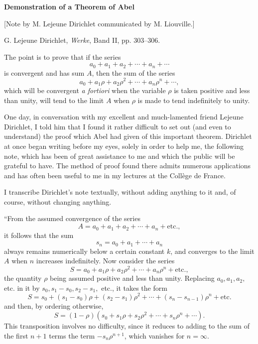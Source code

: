 \documentclass[11pt]{article}
\begin{document}
\begin{center}
{\Large\bfseries Demonstration of a Theorem of Abel\par}
\vspace{0.35em}
{\normalsize [Note by M. Lejeune Dirichlet communicated by M. Liouville.]\par}
\vspace{0.8em}
{\small G. Lejeune Dirichlet, \emph{Werke}, Band II, pp. 303--306.}
\end{center}


The point is to prove that if the series
\[
a_0+a_1+a_2+\cdots+a_n+\cdots
\]
is convergent and has sum \(A\), then the sum of the series
\[
a_0+a_1\rho+a_2\rho^2+\cdots+a_n\rho^n+\cdots,
\]
which will be convergent \emph{a fortiori} when the variable \(\rho\) is taken positive and less than unity, will tend to the limit \(A\) when \(\rho\) is made to tend indefinitely to unity.

One day, in conversation with my excellent and much-lamented friend Lejeune Dirichlet, I told him that I found it rather difficult to set out (and even to understand) the proof which Abel had given of this important theorem. Dirichlet at once began writing before my eyes, solely in order to help me, the following note, which has been of great assistance to me and which the public will be grateful to have. The method of proof found there admits numerous applications and has often been useful to me in my lectures at the Collège de France.

I transcribe Dirichlet's note textually, without adding anything to it and, of course, without changing anything.

``From the assumed convergence of the series
\[
A=a_0+a_1+a_2+\cdots+a_n+\text{etc.},
\]
it follows that the sum
\[
s_n=a_0+a_1+\cdots+a_n
\]
always remains numerically below a certain constant \(k\), and converges to the limit \(A\) when \(n\) increases indefinitely. Now consider the series
\[
S=a_0+a_1\rho+a_2\rho^2+\cdots+a_n\rho^n+\text{etc.},
\]
the quantity \(\rho\) being assumed positive and less than unity. Replacing \(a_0,a_1,a_2,\) etc. in it by \(s_0, s_1-s_0, s_2-s_1,\) etc., it takes the form
\[
S=s_0+(s_1-s_0)\rho+(s_2-s_1)\rho^2+\cdots+(s_n-s_{n-1})\rho^n+\text{etc.}
\]
and then, by ordering otherwise,
\[
S=(1-\rho)(s_0+s_1\rho+s_2\rho^2+\cdots+s_n\rho^n+\cdots).
\]
This transposition involves no difficulty, since it reduces to adding to the sum of the first \(n+1\) terms the term \(-s_n\rho^{n+1}\), which vanishes for \(n=\infty\).
\end{document}
